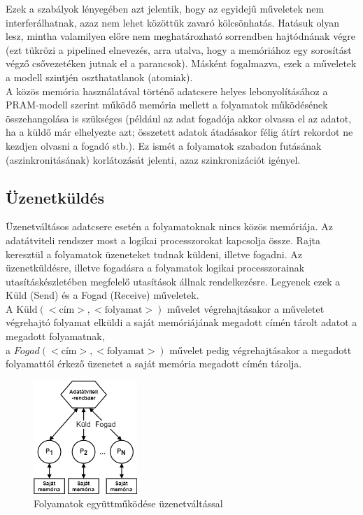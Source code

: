 \documentclass[tikz,12pt,margin=0px]{article}
\begin{document}
    \noindent Ezek a szabályok lényegében azt jelentik, hogy az egyidejű műveletek nem interferálhatnak, azaz nem lehet közöttük zavaró kölcsönhatás. Hatásuk olyan lesz, mintha valamilyen előre nem meghatározható sorrendben hajtódnának végre (ezt tükrözi a pipelined elnevezés, arra utalva, hogy a memóriához egy sorosítást végző csővezetéken jutnak el a parancsok). Másként fogalmazva, ezek a műveletek a modell szintjén oszthatatlanok (atomiak).\\

    \noindent A közös memória használatával történő adatcsere helyes lebonyolításához a PRAM-modell szerint működő memória mellett a folyamatok működésének összehangolása is szükséges (például az adat fogadója akkor olvassa el az adatot, ha a küldő már elhelyezte azt; összetett adatok átadásakor félig átírt rekordot ne kezdjen olvasni a fogadó stb.). Ez ismét a folyamatok szabadon futásának (aszinkronitásának) korlátozását jelenti, azaz szinkronizációt igényel.

	\subsection*{Üzenetküldés}
	
    Üzenetváltásos adatcsere esetén a folyamatoknak nincs közös memóriája. Az adatátviteli rendszer most a logikai processzorokat kapcsolja össze. Rajta keresztül a folyamatok üzeneteket tudnak küldeni, illetve fogadni. Az üzenetküldésre, illetve fogadásra a folyamatok logikai processzorainak utasításkészletében megfelelő utasítások állnak rendelkezésre. Legyenek ezek a Küld (Send) és a Fogad (Receive) műveletek.\\

    \noindent A $\text{Küld}(<\text{cím}>,<\text{folyamat}>)$ művelet végrehajtásakor a műveletet végrehajtó folyamat elküldi a saját memóriájának megadott címén tárolt adatot a megadott folyamatnak,\\ a $Fogad(<\text{cím}>,<\text{folyamat}>)$ művelet pedig végrehajtásakor a megadott folyamattól érkező üzenetet a saját memória megadott címén tárolja.

    \begin{figure}[H]
        \centering
        \includegraphics[width=0.35\textwidth]{img/messaging_sync.png}
        \caption{Folyamatok együttműködése üzenetváltással}
        \label{messaging_sync}
    \end{figure}
\end{document}
